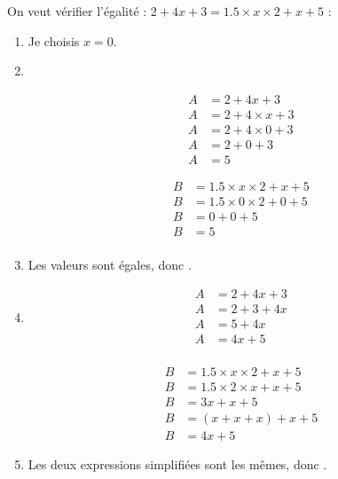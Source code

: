 \documentclass[12pt,a4paper]{article}
\begin{document}
\begin{myex}
	
	On veut vérifier l'égalité : $2 + 4x + 3 = \num{1.5} \times x \times 2 + x + 5$ :
	\begin{enumerate}
		\item Je choisis $x=0$.
		\item \ 
		
		\vspace*{-2cm}		
		
		\begin{multicols}{2}
			\begin{align*}
			A &= 2 + 4x + 3  \\
			A &= 2 + 4 \times x + 3  \\
			A  &= 2 + 4 \times 0 + 3  \\
			A  &= 2 + 0 + 3  \\
			A  &= 5
			\end{align*}
			
			
			\begin{align*}
			B &= \num{1.5} \times x \times 2 + x + 5 \\
			B &= \num{1.5} \times 0 \times 2 + 0 + 5 \\
			B &= 0 + 0 + 5 \\
			B &= 5 \\							
			\end{align*}
		\end{multicols}
		
		\item Les valeurs sont égales, donc .
		
		\item \begin{multicols}{2}
			\begin{align*}
				A &= 2 + 4x + 3  \\
				A &= 2 + 3 + 4x  \\
				A  &= 5 + 4x  \\
				A  &= 4x + 5  \\	
			\end{align*}
			
			
			\begin{align*}
				B &= \num{1.5} \times x \times 2 + x + 5 \\
				B &= \num{1.5} \times 2 \times x + x + 5 \\
				B &= 3x + x + 5 \\
				B &= (x + x + x) + x + 5 \\						
				B &= 4x + 5 
			\end{align*}
		\end{multicols}
	
		\item Les deux expressions simplifiées sont les mêmes, donc .
	\end{enumerate}
	
\end{myex}
\end{document}
